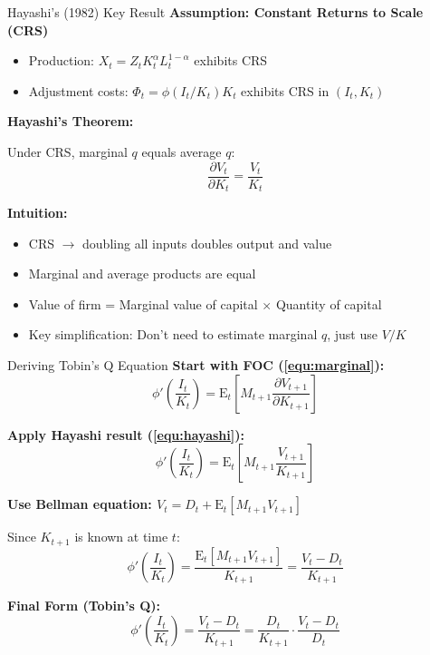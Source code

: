 \documentclass{beamer}
\begin{document}
\begin{frame}{Hayashi's (1982) Key Result}
    \textbf{Assumption: Constant Returns to Scale (CRS)}
    \begin{itemize}
        \item Production: $X_t = Z_t K_t^\alpha L_t^{1-\alpha}$ exhibits CRS
        \item Adjustment costs: $\Phi_t = \phi(I_t/K_t) K_t$ exhibits CRS in $(I_t, K_t)$
    \end{itemize}
    
    
    \textbf{Hayashi's Theorem:}
    
    Under CRS, marginal $q$ equals average $q$:
    \begin{equation}\label{equ:hayashi}
        \boxed{
        \frac{\partial V_t}{\partial K_t} = \frac{V_t}{K_t}
        }
    \end{equation}
    
    
    \textbf{Intuition:}
    \begin{itemize}
        \item CRS $\rightarrow$ doubling all inputs doubles output and value
        \item Marginal and average products are equal
        \item Value of firm = Marginal value of capital $\times$ Quantity of capital
        \item Key simplification: Don't need to estimate marginal $q$, just use $V/K$
    \end{itemize}
\end{frame}

\begin{frame}{Deriving Tobin's Q Equation}
    \textbf{Start with FOC (\ref{equ:marginal}):}
    \begin{equation*}
        \phi'\left(\frac{I_t}{K_t}\right) = \mathrm{E}_t\left[M_{t+1} \frac{\partial V_{t+1}}{\partial K_{t+1}}\right]
    \end{equation*}
    
    \textbf{Apply Hayashi result (\ref{equ:hayashi}):}
    \begin{equation*}
        \phi'\left(\frac{I_t}{K_t}\right) = \mathrm{E}_t\left[M_{t+1} \frac{V_{t+1}}{K_{t+1}}\right]
    \end{equation*}
    
    \textbf{Use Bellman equation: $V_t = D_t + \mathrm{E}_t[M_{t+1} V_{t+1}]$}
    
    Since $K_{t+1}$ is known at time $t$:
    \begin{equation*}
        \phi'\left(\frac{I_t}{K_t}\right) = \frac{\mathrm{E}_t[M_{t+1} V_{t+1}]}{K_{t+1}} = \frac{V_t - D_t}{K_{t+1}}
    \end{equation*}
    
    \textbf{Final Form (Tobin's Q):}
    \begin{equation}\label{equ:tobins q}
        \boxed{
        \phi'\left(\frac{I_t}{K_t}\right) = \frac{V_t - D_t}{K_{t+1}} = \frac{D_t}{K_{t+1}} \cdot \frac{V_t - D_t}{D_t}
        }
    \end{equation}
\end{frame}
\end{document}

